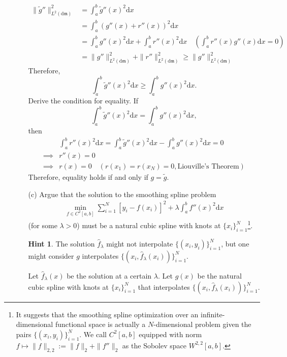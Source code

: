 \documentclass[10pt]{article}
\theoremstyle{definition}
\newtheorem*{hint}{Hint}
\theoremstyle{remark}
\newcommand{\fm}{\mathfrak{m}}
\newcommand{\rd}{\mathrm{d}}		%
\begin{document}
\begin{enumerate}
\begin{itemize}
		\begin{align*}
		    \|\widetilde{g}''\|_{L^{2}(\rd \fm)}^{2} & = \int_{a}^{b}\widetilde{g}''(x)^{2}\rd x \\
		    & = \int_{a}^{b}(g''(x) + r''(x))^{2}\rd x \\
		    & = \int_{a}^{b}g''(x)^{2}\rd x + \int_{a}^{b}r''(x)^{2}\rd x \quad(\int_{a}^{b}r''(x)g''(x) \rd x = 0) \\
		    & = \|g''\|_{L^{2}(\rd \fm)}^{2} + \|r''\|_{L^{2}(\rd \fm)}^{2} \ge \|g''\|_{L^{2}(\rd \fm)}^{2}
		\end{align*}
		Therefore, \[ \int_{a}^{b}\widetilde{g}''(x)^{2}\rd x \ge \int_{a}^{b}g''(x)^{2}\rd x. \]
		Derive the condition for equality. If \[ \int_{a}^{b}\widetilde{g}''(x)^{2}\rd x = \int_{a}^{b}g''(x)^{2}\rd x, \]
		then
		\begin{align*}
		    & \int_{a}^{b}r''(x)^2 \rd x = \int_{a}^{b}\widetilde{g}''(x)^{2}\rd x - \int_{a}^{b}g''(x)^{2}\rd x = 0 \\
		    \implies & r''(x) = 0 \\
		    \implies & r(x) = 0 \quad (r(x_1) = r(x_N) = 0, \text{Liouville's Theorem})
		\end{align*}
		Therefore, equality holds if and only if $ g = \widetilde{g} $.
		
		
		
		
		\item [(c)] Argue that the solution to the smoothing spline problem
		\begin{align}
		\min_{f \in C^{2}[a,b]} \sum_{i=1}^{N}[y_{i}-f(x_{i})]^{2} + \lambda \int_{a}^{b}f''(x)^{2}\rd x\label{eq_smooth_sp}
		\end{align}
		(for some $ \lambda > 0 $) must be a natural cubic spline with knots at $ \{ x_{i} \}_{i=1}^{N} $\footnote{It suggests that the smoothing spline optimization over an infinite-dimensional functional space is actually a $ N $-dimensional problem given the pairs $ \{ (x_{i},y_{i}) \}_{i=1}^{N} $. We call $ C^{2}[a,b] $ equipped with norm $ f\mapsto \|f\|_{2,2} := \|f\|_{2} + \|f''\|_{2} $ as the Sobolev space $ W^{2,2}[a,b] $.}.
		
		\begin{hint}
			The solution $ \widehat{f}_{\lambda} $ might not interpolate $ \{ (x_{i},y_{i}) \}_{i=1}^{N} $, but one might consider $ g $ interpolates $ \{ (x_{i},\widehat{f}_{\lambda}(x_{i})) \}_{i=1}^{N} $.
		\end{hint}
		
		Let $ \widehat{f}_{\lambda}(x) $ be the solution at a certain $\lambda$. Let $g(x)$ be the natural cubic spline with knots at $ \{ x_{i} \}_{i=1}^{N} $ that interpolates $ \{ (x_{i},\widehat{f}_{\lambda}(x_{i})) \}_{i=1}^{N} $. 
		

\end{itemize}
\end{enumerate}
\end{document}
